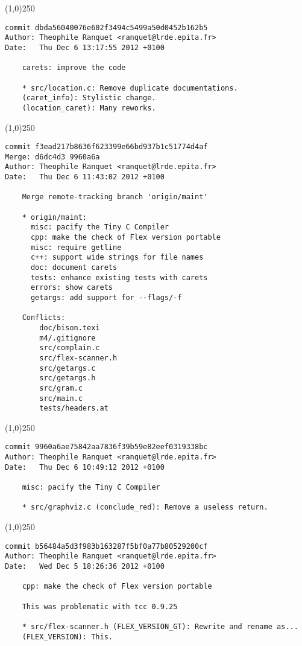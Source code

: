 \line(1,0){250}
\begin{verbatim}
commit dbda56040076e602f3494c5499a50d0452b162b5
Author: Theophile Ranquet <ranquet@lrde.epita.fr>
Date:   Thu Dec 6 13:17:55 2012 +0100

    carets: improve the code
    
    * src/location.c: Remove duplicate documentations.
    (caret_info): Stylistic change.
    (location_caret): Many reworks.

\end{verbatim}
\line(1,0){250}
\begin{verbatim}
commit f3ead217b8636f623399e66bd937b1c51774d4af
Merge: d6dc4d3 9960a6a
Author: Theophile Ranquet <ranquet@lrde.epita.fr>
Date:   Thu Dec 6 11:43:02 2012 +0100

    Merge remote-tracking branch 'origin/maint'
    
    * origin/maint:
      misc: pacify the Tiny C Compiler
      cpp: make the check of Flex version portable
      misc: require getline
      c++: support wide strings for file names
      doc: document carets
      tests: enhance existing tests with carets
      errors: show carets
      getargs: add support for --flags/-f
    
    Conflicts:
    	doc/bison.texi
    	m4/.gitignore
    	src/complain.c
    	src/flex-scanner.h
    	src/getargs.c
    	src/getargs.h
    	src/gram.c
    	src/main.c
    	tests/headers.at

\end{verbatim}
\line(1,0){250}
\begin{verbatim}
commit 9960a6ae75842aa7836f39b59e82eef0319338bc
Author: Theophile Ranquet <ranquet@lrde.epita.fr>
Date:   Thu Dec 6 10:49:12 2012 +0100

    misc: pacify the Tiny C Compiler
    
    * src/graphviz.c (conclude_red): Remove a useless return.

\end{verbatim}
\line(1,0){250}
\begin{verbatim}
commit b56484a5d3f983b163287f5bf0a77b80529200cf
Author: Theophile Ranquet <ranquet@lrde.epita.fr>
Date:   Wed Dec 5 18:26:36 2012 +0100

    cpp: make the check of Flex version portable
    
    This was problematic with tcc 0.9.25
    
    * src/flex-scanner.h (FLEX_VERSION_GT): Rewrite and rename as...
    (FLEX_VERSION): This.

\end{verbatim}

